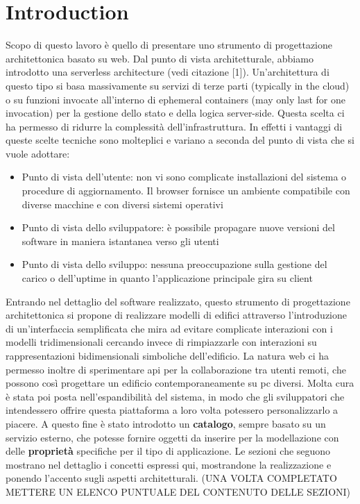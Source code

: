 \section{Introduction}

Scopo di questo lavoro è quello di presentare uno strumento di progettazione architettonica basato su web. Dal punto di vista architetturale, abbiamo introdotto una serverless architecture (vedi citazione [1]). Un’architettura di questo tipo si basa massivamente su servizi di terze parti (typically in the cloud) o su funzioni invocate all’interno di ephemeral containers (may only last for one invocation) per la gestione dello stato e della logica server-side. Questa scelta ci ha permesso di ridurre la complessità dell’infrastruttura.
In effetti i vantaggi di queste scelte tecniche sono molteplici e variano a seconda del punto di vista che si vuole adottare:
\begin{itemize}
\item Punto di vista dell’utente: non vi sono complicate installazioni del sistema o procedure di aggiornamento. Il browser fornisce un ambiente compatibile con diverse macchine e con diversi sistemi operativi
\item Punto di vista dello sviluppatore: è possibile propagare nuove versioni del software in maniera istantanea verso gli utenti
\item Punto di vista dello sviluppo: nessuna preoccupazione sulla gestione del carico o dell’uptime in quanto l’applicazione principale gira su client
\end{itemize}
Entrando nel dettaglio del software realizzato, questo strumento di progettazione architettonica si propone di realizzare modelli di edifici attraverso l’introduzione di un’interfaccia semplificata che mira ad evitare complicate interazioni con i modelli tridimensionali cercando invece di rimpiazzarle con interazioni su rappresentazioni bidimensionali simboliche dell’edificio.
La natura web ci ha permesso inoltre di sperimentare api per la collaborazione tra utenti remoti, che possono così progettare un edificio contemporaneamente su pc diversi.
Molta cura è stata poi posta nell’espandibilità del sistema, in modo che gli sviluppatori che intendessero offrire questa piattaforma a loro volta potessero personalizzarlo a piacere. A questo fine è stato introdotto un \textbf{catalogo}, sempre basato su un servizio esterno, che potesse fornire oggetti da inserire per la modellazione con delle \textbf{proprietà} specifiche per il tipo di applicazione.
Le sezioni che seguono mostrano nel dettaglio i concetti espressi qui, mostrandone la realizzazione e ponendo l’accento sugli aspetti architetturali. (UNA VOLTA COMPLETATO METTERE UN ELENCO PUNTUALE DEL CONTENUTO DELLE SEZIONI)
